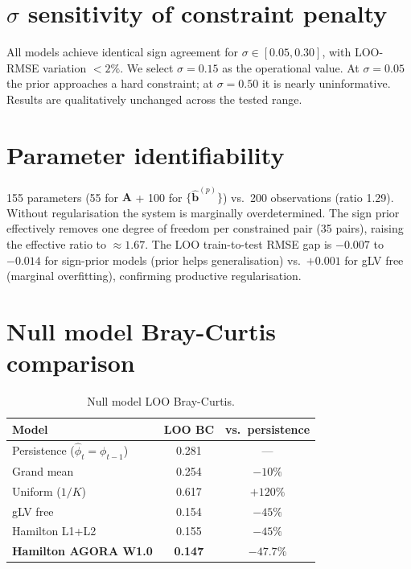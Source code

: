 \documentclass[11pt,a4paper]{article}
\newcommand{\bA}{\mathbf{A}}
\newcommand{\bb}{\mathbf{b}}
\begin{document}
\section{\texorpdfstring{$\sigma$}{sigma} sensitivity of constraint penalty}
\label{app:sigma}

All models achieve identical sign agreement for $\sigma\in[0.05,0.30]$, with LOO-RMSE
variation $<2\%$. We select $\sigma=0.15$ as the operational value. At $\sigma=0.05$
the prior approaches a hard constraint; at $\sigma=0.50$ it is nearly uninformative.
Results are qualitatively unchanged across the tested range.

\section{Parameter identifiability}
\label{app:ident}

155 parameters (55 for $\bA$ + 100 for $\{\hat{\bb}^{(p)}\}$) vs.\ 200 observations
(ratio 1.29). Without regularisation the system is marginally overdetermined. The sign
prior effectively removes one degree of freedom per constrained pair (35 pairs),
raising the effective ratio to $\approx 1.67$. The LOO train-to-test RMSE gap is
$-0.007$ to $-0.014$ for sign-prior models (prior helps generalisation) vs.\ $+0.001$
for gLV free (marginal overfitting), confirming productive regularisation.

\section{Null model Bray-Curtis comparison}
\label{app:null}

\begin{table}[htb]
\centering
\caption{Null model LOO Bray-Curtis.}
\label{tab:null}
\begin{tabular}{lcc}
\toprule
Model & LOO BC & vs.\ persistence \\
\midrule
Persistence ($\hat\phi_t=\phi_{t-1}$) & 0.281 & --- \\
Grand mean & 0.254 & $-10\%$ \\
Uniform ($1/K$) & 0.617 & $+120\%$ \\
\midrule
gLV free & 0.154 & $-45\%$ \\
Hamilton L1+L2 & 0.155 & $-45\%$ \\
\textbf{Hamilton AGORA W1.0} & \textbf{0.147} & $\mathbf{-47.7\%}$ \\
\bottomrule
\end{tabular}
\end{table}
\end{document}
